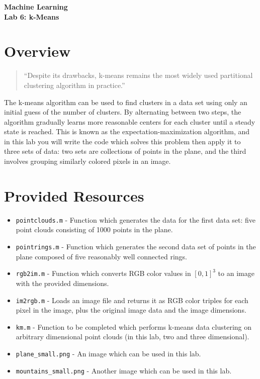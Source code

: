 \documentclass[11pt,noanswers,addpoints]{exam}
\begin{document}
{\Large{\textbf{Machine Learning}}} \\[2mm]
\textbf{\Huge{Lab 6: k-Means}}\\[2mm]

\section{Overview}

\begin{quote}
``Despite its drawbacks, k-means remains the most widely used partitional clustering
algorithm in practice.''

\end{quote}

The k-means algorithm can be used to find clusters in a data set using only an initial guess of
the number of clusters. By alternating between two steps, the algorithm gradually learns more
reasonable centers for each cluster until a steady state is reached. This is known as the
expectation-maximization algorithm, and in this lab you will write the code which solves this
problem then apply it to three sets of data: two sets are collections of points in the plane, and the 
third involves grouping similarly colored pixels in an image.

\section{Provided Resources}

\begin{itemize}
\item \texttt{pointclouds.m} - Function which generates the data for the first data set: five point clouds 
consisting of 1000 points in the plane.
\item \texttt{pointrings.m} - Function which generates the second data set of points in the plane
 composed of five reasonably well connected rings.
\item \texttt{rgb2im.m} - Function which converts RGB color values in $[0,1]^3$ to an image with the provided
dimensions.
\item \texttt{im2rgb.m} - Loads an image file and returns it as RGB color triples for each pixel in the
image, plus the original image data and the image dimensions.
\item \texttt{km.m} - Function to be completed which performs k-means data clustering on arbitrary dimensional
point clouds (in this lab, two and three dimensional).
\item \texttt{plane\_small.png} - An image which can be used in this lab.
\item \texttt{mountains\_small.png} - Another image which can be used in this lab.
\end{itemize}
\end{document}
